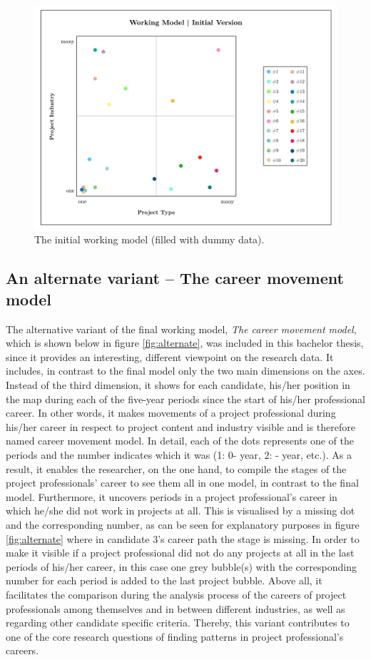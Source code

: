 \begin{figure}[!hbt]
    \captionsetup{font=small}
  \centering
  \includegraphics[width=.45\columnwidth]{figures/WM_Initial.png}
  \caption[The initial working model]{The initial working model (filled with dummy data).}
  \label{fig:initial}
\end{figure}



\subsection{An alternate variant – The career movement model}
\label{sec:cmm}
The alternative variant of the final working model, \textit{The career movement model}, which is shown below in figure \ref{fig:alternate}, was included in this bachelor thesis, since it provides an interesting, different viewpoint on the research data. It includes, in contrast to the final model only the two main dimensions on the axes. Instead of the third dimension, it shows for each candidate, his/her position in the map during each of the five-year periods since the start of his/her professional career. In other words, it makes movements of a project professional during his/her career in respect to project content and industry visible and is therefore named career movement model. In detail, each of the dots represents one of the periods and the number indicates which it was (1: 0- year, 2: - year, etc.). As a result, it enables the researcher, on the one hand, to compile the stages of the project professionals' career to see them all in one model, in contrast to the final model. Furthermore, it uncovers periods in a project professional's career in which he/she did not work in projects at all. This is visualised by a missing dot and the corresponding number, as can be seen for explanatory purposes in figure \ref{fig:alternate} where in candidate 3's career path the  stage is missing. In order to make it visible if a project professional did not do any projects at all in the last periods of his/her career, in this case one grey bubble(s) with the corresponding number for each period is added to the last project bubble. Above all, it facilitates the comparison during the analysis process of the careers of project professionals among themselves and in between different industries, as well as regarding other candidate specific criteria. Thereby, this variant contributes to one of the core research questions of finding patterns in project professional's careers. \\



